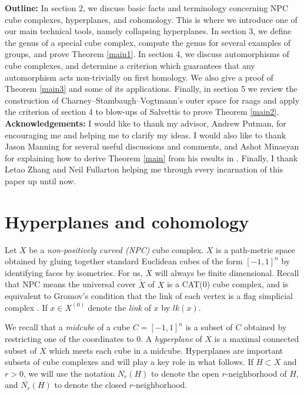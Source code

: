 \documentclass[11pt]{amsart}
\numberwithin{thm}{section}
\theoremstyle{remark}
\theoremstyle{definition}
\newcommand{\overl}[1]{\overline{#1}}
\begin{document}
\noindent \textbf{Outline:} In section 2, we discuss basic facts and terminology concerning NPC cube complexes, hyperplanes, and cohomology.  This is where we introduce one of our main technical tools, namely collapsing hyperplanes.  In section 3, we define the genus of a special cube complex, compute the genus for several examples of groups, and prove Theorem \ref{main1}.  In section 4, we discuss automorphisms of cube complexes, and determine a criterion which guarantees that any automorphism acts non-trivially on first homology.  We also give a proof of Theorem \ref{main3} and some of its applications.  Finally, in section 5 we review the construction of Charney--Stambaugh--Vogtmann's outer space for raags and apply the criterion of section 4 to blow-ups of Salvettis to prove Theorem \ref{main2}.
\\

\noindent \textbf{Acknowledgements:} I would like to thank my advisor, Andrew Putman, for encouraging me and helping me to clarify my ideas. I would also like to thank Jason Manning for several useful discussions and comments, and Ashot Minasyan for explaining how to derive Theorem \ref{main} from his results in \cite{AM15}.  Finally, I thank Letao Zhang and Neil Fullarton helping me through every incarnation of this paper up until now. 

\section{Hyperplanes and cohomology}
Let $X$ be a \emph{non-positively curved (NPC)} cube complex. $X$ is a path-metric space obtained by gluing together standard Euclidean cubes of the form $[-1,1]^n$ by identifying faces by isometries.   For us, $X$ will always be finite dimensional.  Recall that NPC means the universal cover $\widetilde{X}$ of $X$ is a CAT(0) cube complex, and is equivalent to Gromov's condition that the link of each vertex is a flag simplicial complex \cite{Wise12}. If $x\in X^{(0)}$ denote the \emph{link} of $x$ by $lk(x)$.  

We recall that a \emph{midcube} of a cube $C=[-1,1]^n$ is a subset of $C$ obtained by restricting one of the coordinates to 0. A \emph{hyperplane} of $X$ is a maximal connected subset of $X$ which meets each cube in a midcube. Hyperplanes are important subsets of cube complexes and will play a key role in what follows.  If $H\subset X$ and $r>0$, we will use the notation $N_r(H)$ to denote the open $r$-neighborhood of $H$, and $\overl{N_r}(H)$ to denote the closed $r$-neighborhood.  
\end{document}
